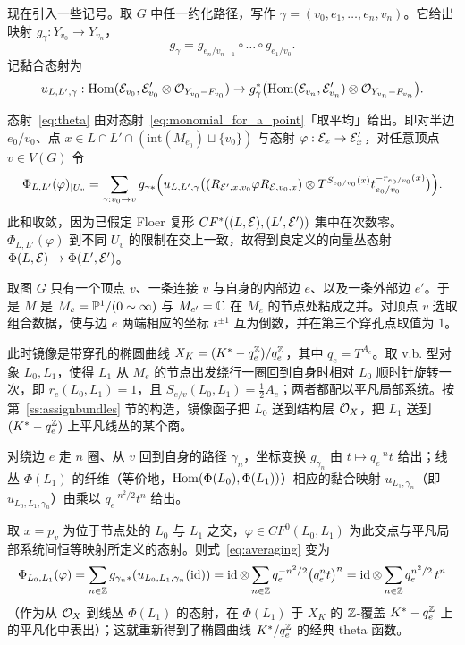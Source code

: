 现在引入一些记号。取 $G$ 中任一约化路径，写作 $\gamma=(v_0,e_1,\dots,e_n,v_n)$。它给出映射 $g_{\gamma}:Y_{v_0}\to Y_{v_n}$，
\[
g_{\gamma}=g_{e_n/v_{n-1}}\circ\dots\circ g_{e_1/v_0}.
\]
记黏合态射为
\[
u_{L,L',\gamma}:\operatorname{Hom}(\mathcal{E}_{v_0},\mathcal{E}'_{v_0}\otimes \mathcal{O}_{Y_{v_0}-F_{v_0}})\to g_{\gamma}^*\bigl(\operatorname{Hom}(\mathcal{E}_{v_n},\mathcal{E}'_{v_n})\otimes \mathcal{O}_{Y_{v_n}-F_{v_n}}\bigr).
\]

态射~\eqref{eq:theta} 由对态射~\eqref{eq:monomial_for_a_point}「取平均」给出。即对半边 $e_0/v_0$、点 $x\in L\cap L'\cap (\mathrm{int}(M_{e_0})\sqcup\{v_0\})$ 与态射 $\varphi:\mathcal{E}_x\to\mathcal{E}'_x$，对任意顶点 $v\in V(G)$ 令
\begin{equation}\label{eq:averaging}
\Phi_{L,L'}(\varphi)_{\mid U_v}=\sum_{\gamma:v_0\to v}g_{\gamma*}\Bigl(u_{L,L',\gamma}\bigl((R_{\mathcal{E}',x,v_0}\varphi R_{\mathcal{E},v_0,x})\otimes T^{S_{e_0/v_0}(x)}t_{e_0/v_0}^{-r_{e_0/v_0}(x)}\bigr)\Bigr).
\end{equation}
此和收敛，因为已假定 Floer 复形 $CF^{*}((L,\mathcal{E}),(L',\mathcal{E}'))$ 集中在次数零。$\Phi_{L,L'}(\varphi)$ 到不同 $U_v$ 的限制在交上一致，故得到良定义的向量丛态射 $\Phi(L,\mathcal{E})\to \Phi(L',\mathcal{E}')$。

\begin{example}\label{ex:elliptic}
取图 $G$ 只有一个顶点 $v$、一条连接 $v$ 与自身的内部边 $e$、以及一条外部边 $e'$。于是 $M$ 是 $M_e=\mathbb{P}^1/(0\sim\infty)$ 与 $M_{e'}=\mathbb{C}$ 在 $M_e$ 的节点处粘成之并。对顶点 $v$ 选取组合数据，使与边 $e$ 两端相应的坐标 $t^{\pm 1}$ 互为倒数，并在第三个穿孔点取值为 $1$。

此时镜像是带穿孔的椭圆曲线 $X_K=(K^*-q_e^{\mathbb{Z}})/q_e^{\mathbb{Z}}$，其中 $q_e=T^{A_e}$。取 v.b. 型对象 $L_0,L_1$，使得 $L_1$ 从 $M_e$ 的节点出发绕行一圈回到自身时相对 $L_0$ 顺时针旋转一次，即 $r_e(L_0,L_1)=1$，且 $S_{e/v}(L_0,L_1)=\frac12 A_e$；两者都配以平凡局部系统。按第~\ref{ss:assignbundles} 节的构造，镜像函子把 $L_0$ 送到结构层 $\mathcal{O}_X$，把 $L_1$ 送到 $(K^*-q_e^{\mathbb{Z}})$ 上平凡线丛的某个商。

对绕边 $e$ 走 $n$ 圈、从 $v$ 回到自身的路径 $\gamma_n$，坐标变换 $g_{\gamma_n}$ 由 $t\mapsto q_e^{-n} t$ 给出；线丛 $\Phi(L_1)$ 的纤维（等价地，$\operatorname{Hom}(\Phi(L_0),\Phi(L_1))$）相应的黏合映射 $u_{L_1,\gamma_n}$（即 $u_{L_0,L_1,\gamma_n}$）由乘以 $q_e^{-n^2/2} t^{n}$ 给出。

取 $x=p_v$ 为位于节点处的 $L_0$ 与 $L_1$ 之交，$\varphi\in CF^0(L_0,L_1)$ 为此交点与平凡局部系统间恒等映射所定义的态射。则式~\eqref{eq:averaging} 变为
\[
\Phi_{L_0,L_1}(\varphi)=\sum_{n\in\mathbb{Z}} g_{\gamma_n *}(u_{L_0,L_1,\gamma_n}(\mathrm{id}))
=\operatorname{id}\otimes \sum_{n\in\mathbb{Z}} q_e^{-n^2/2}\bigl(q_e^{n}t\bigr)^{n}
=\operatorname{id}\otimes \sum_{n\in\mathbb{Z}} q_e^{n^2/2}\, t^n
\]
（作为从 $\mathcal{O}_X$ 到线丛 $\Phi(L_1)$ 的态射，在 $\Phi(L_1)$ 于 $X_K$ 的 $\mathbb{Z}$-覆盖 $K^*-q_e^{\mathbb{Z}}$ 上的平凡化中表出）；这就重新得到了椭圆曲线 $K^*/q_e^{\mathbb{Z}}$ 的经典 theta 函数。
\end{example}

